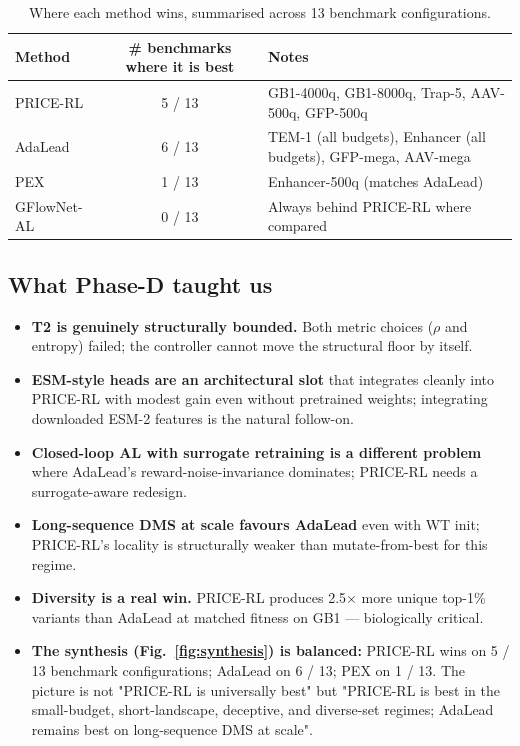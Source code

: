 \begin{table}[t]
\centering
\caption{Where each method wins, summarised across 13 benchmark configurations.}
\label{tab:wins}
\begin{tabular}{lcl}
\toprule
Method & \# benchmarks where it is best & Notes \\
\midrule
PRICE-RL                            & 5 / 13 & GB1-4000q, GB1-8000q, Trap-5, AAV-500q, GFP-500q \\
AdaLead                             & 6 / 13 & TEM-1 (all budgets), Enhancer (all budgets), GFP-mega, AAV-mega \\
PEX                                 & 1 / 13 & Enhancer-500q (matches AdaLead) \\
GFlowNet-AL                         & 0 / 13 & Always behind PRICE-RL where compared \\
\bottomrule
\end{tabular}
\end{table}

\subsection{What Phase-D taught us}

\begin{itemize}\itemsep0pt
  \item \textbf{T2 is genuinely structurally bounded.} Both metric choices (\(\rho\) and entropy) failed; the controller cannot move the structural floor by itself.
  \item \textbf{ESM-style heads are an architectural slot} that integrates cleanly into PRICE-RL with modest gain even without pretrained weights; integrating downloaded ESM-2 features is the natural follow-on.
  \item \textbf{Closed-loop AL with surrogate retraining is a different problem} where AdaLead's reward-noise-invariance dominates; PRICE-RL needs a surrogate-aware redesign.
  \item \textbf{Long-sequence DMS at scale favours AdaLead} even with WT init; PRICE-RL's locality is structurally weaker than mutate-from-best for this regime.
  \item \textbf{Diversity is a real win.} PRICE-RL produces 2.5$\times$ more unique top-1\% variants than AdaLead at matched fitness on GB1 --- biologically critical.
  \item \textbf{The synthesis (Fig.~\ref{fig:synthesis}) is balanced:} PRICE-RL wins on 5 / 13 benchmark configurations; AdaLead on 6 / 13; PEX on 1 / 13. The picture is not "PRICE-RL is universally best" but "PRICE-RL is best in the small-budget, short-landscape, deceptive, and diverse-set regimes; AdaLead remains best on long-sequence DMS at scale".
\end{itemize}
